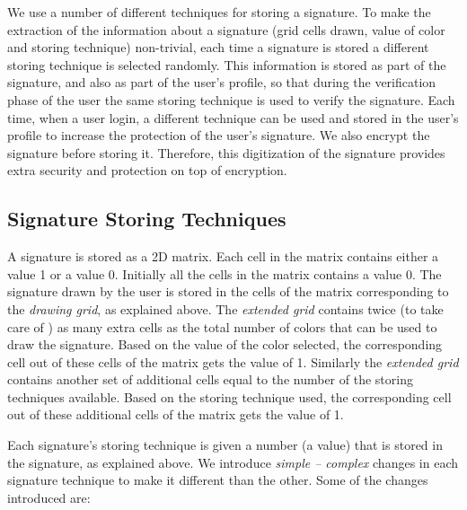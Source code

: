 \documentclass[conference]{IEEEtran}
\begin{document}
We use a number of different techniques for storing a signature. To make the extraction of the information about a signature (grid cells drawn, value of color and storing technique) non-trivial, each time a signature is stored a different storing technique is selected randomly. This information is stored as part of the signature, and also as part of the user's profile, so that during the verification phase of the user the same storing technique is used to verify the signature. Each time, when a user login, a different technique can be used and stored in the user's profile to increase the protection of the user's signature. We also encrypt the signature before storing it. Therefore, this digitization of the signature provides extra security and protection on top of encryption.


\subsection{Signature Storing Techniques}\label{sec:storing-techniques}



A signature is stored as a 2D matrix. Each cell in the matrix contains either a value 1 or a value 0. Initially all the cells in the matrix contains a value 0. The signature drawn by the user is stored in the cells of the matrix corresponding to the \emph{drawing grid}, as explained above. The \emph{extended grid} contains twice (to take care of ) as many extra cells as the total number of colors that can be used to draw the signature. Based on the value of the color selected, the corresponding cell out of these cells of the matrix gets the value of 1. Similarly the \emph{extended grid} contains another set of additional cells equal to the number of the storing techniques available. Based on the storing technique used, the corresponding cell out of these additional cells of the matrix gets the value of 1.

Each signature's storing technique is given a number (a value) that is stored in the signature, as explained above. We introduce \emph{simple -- complex} changes in each signature technique to make it different than the other. Some of the changes introduced are:
\end{document}
